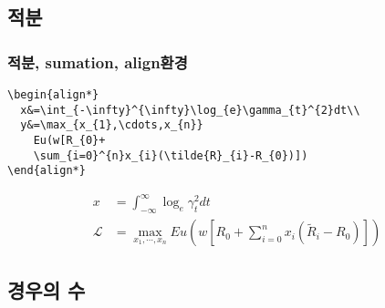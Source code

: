 \documentclass{beamer}
\begin{document}
\subsection{적분}

\begin{frame}[fragile]

\frametitle{적분, sumation, align환경}

\begin{block}{}
\begin{center}
\begin{verbatim}
\begin{align*}
  x&=\int_{-\infty}^{\infty}\log_{e}\gamma_{t}^{2}dt\\
  y&=\max_{x_{1},\cdots,x_{n}} 
    Eu(w[R_{0}+
    \sum_{i=0}^{n}x_{i}(\tilde{R}_{i}-R_{0})])
\end{align*}
\end{verbatim}
\end{center}

\end{block}

\begin{block}{}
\begin{align*}
  x&=\int_{-\infty}^{\infty}\log_{e}\gamma_{t}^{2}dt\\
  \mathcal{L}&=\max_{x_{1},\cdots,x_{n}} 
    Eu(w[R_{0}+\sum_{i=0}^{n}x_{i}(\tilde{R}_{i}-R_{0})])
\end{align*}
\end{block}
\end{frame}


\subsection{경우의 수}
\end{document}
